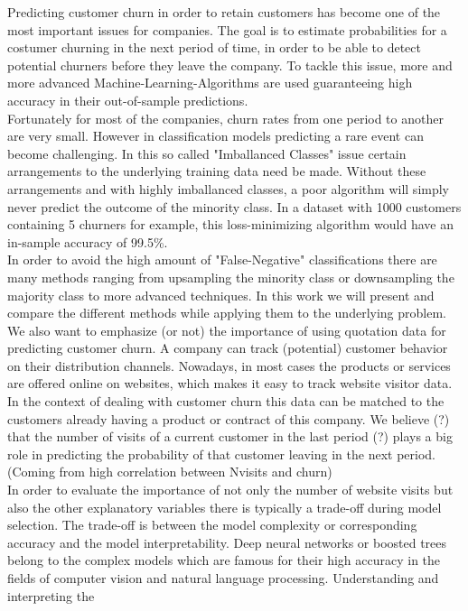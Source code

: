 \documentclass[12pt,titlepage]{article}
\begin{document}
Predicting customer churn in order to retain customers has become one of the most important issues for companies.
The goal is to estimate probabilities for a costumer churning in the next period of time, in order to be able to detect
potential churners before they leave the company. To tackle this issue, more and more advanced Machine-Learning-Algorithms
are used guaranteeing high accuracy in their out-of-sample predictions. \\
Fortunately for most of the companies, churn rates from one period to another are very small. However in classification
models predicting a rare event can become challenging. In this so called "Imballanced Classes" issue certain arrangements
to the underlying training data need be made. Without these arrangements and with highly imballanced classes, a poor
algorithm will simply never predict the outcome of the minority class. In a dataset with 1000 customers containing 5
churners for example, this loss-minimizing algorithm would have an in-sample accuracy of 99.5\%. \\
In order to avoid the high amount of "False-Negative" classifications there are many methods ranging from upsampling the
minority class or downsampling the majority class to more advanced techniques. In this work we will present and compare
the different methods while applying them to the underlying problem. \\
We also want to emphasize (or not) the importance of using quotation data for predicting customer churn. A company can
track (potential) customer behavior on their distribution channels. Nowadays, in most cases the products or services are
offered online on websites, which makes it easy to track website visitor data. In the context of dealing with customer
churn this data can be matched to the customers already having a product or contract of this company. We believe (?) that
the number of visits of a current customer in the last period (?) plays a big role in predicting the probability of that
customer leaving in the next period. (Coming from high correlation between Nvisits and churn)\\
In order to evaluate the importance of not only the number of website visits but also the other explanatory variables there
is typically a trade-off during model selection. The trade-off is between the model complexity or corresponding accuracy
and the model interpretability. Deep neural networks or boosted trees belong to the complex models which are famous for
their high accuracy in the fields of computer vision and natural language processing. Understanding and interpreting the
\end{document}
